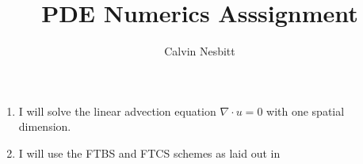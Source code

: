 \documentclass[11pt]{article}
\title{PDE Numerics Asssignment}
\author{Calvin Nesbitt}
\date{}
\begin{document}
\maketitle


\begin{enumerate}
	\item I will solve the linear advection equation $\nabla \cdot u = 0$ with one spatial dimension.
	\item I will use the FTBS and FTCS schemes as laid out in 
	
\end{enumerate}

 
\end{document}
